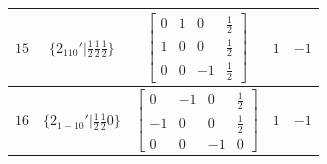 \documentclass[fleqn,8pt]{jsarticle}
\begin{document}
\begin{longtable}{ccccc}
$ 15 $ & $ \{2{}_{110}{}'|\frac{1}{2} \frac{1}{2} \frac{1}{2}\} $ & $ \begin{bmatrix} 0 & 1 & 0 & \frac{1}{2} \\ 1 & 0 & 0 & \frac{1}{2} \\ 0 & 0 & -1 & \frac{1}{2} \end{bmatrix} $ & $ 1 $ & $ -1 $ \\ \hline
$ 16 $ & $ \{2{}_{1-10}{}'|\frac{1}{2} \frac{1}{2} 0\} $ & $ \begin{bmatrix} 0 & -1 & 0 & \frac{1}{2} \\ -1 & 0 & 0 & \frac{1}{2} \\ 0 & 0 & -1 & 0 \end{bmatrix} $ & $ 1 $ & $ -1 $ \\
\end{longtable}
\end{document}
